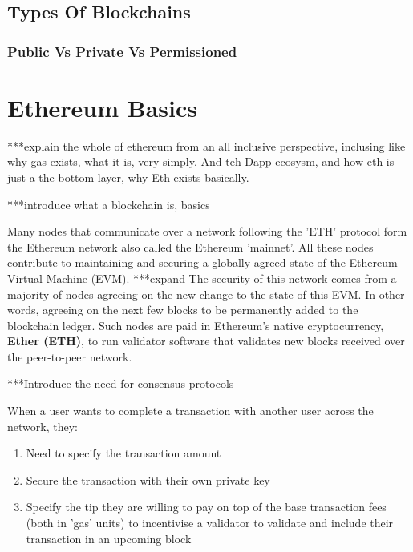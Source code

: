 \subsection{Types Of Blockchains}




\subsubsection{Public Vs Private Vs Permissioned}



\section{Ethereum Basics}

***explain the whole of ethereum from an all inclusive perspective, inclusing like why gas exists, what it is, very simply. And teh Dapp ecosysm, and how eth is just a the bottom layer, why Eth exists basically.

***introduce what a blockchain is, basics

Many nodes that communicate over a network following the 'ETH' protocol form the Ethereum network also called the Ethereum 'mainnet'. All these nodes contribute to maintaining and securing a globally agreed state of the Ethereum Virtual Machine (EVM). ***expand
The security of this network comes from a majority of nodes agreeing on the new change to the state of this EVM. In other words, agreeing on the next few blocks to be permanently added to the blockchain ledger. Such nodes are paid in Ethereum's native cryptocurrency, \textbf{Ether (ETH)}, to run validator software that validates new blocks received over the peer-to-peer network.

***Introduce the need for consensus protocols

When a user wants to complete a transaction with another user across the network, they:
\begin{enumerate}
    \item Need to specify the transaction amount
    \item Secure the transaction with their own private key
    \item Specify the tip they are willing to pay on top of the base transaction fees (both in 'gas' units) to incentivise a validator to validate and include their transaction in an upcoming block
\end{enumerate}

